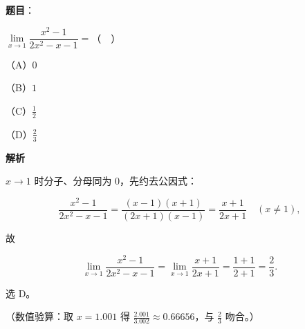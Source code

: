 \begin{answer}

\textbf{题目}：

$\lim\limits_{x\to1}\dfrac{x^2-1}{2x^2-x-1}=$（　）

（A）$0$

（B）$1$

（C）$\frac12$

（D）$\frac23$

\textbf{解析}

$x\to1$ 时分子、分母同为 $0$，先约去公因式：

\nopagebreak[4]
\[\frac{x^{2}-1}{2x^{2}-x-1}=\frac{(x-1)(x+1)}{(2x+1)(x-1)}=\frac{x+1}{2x+1}\quad(x\ne1),\]

故

\nopagebreak[4]
\[\lim_{x\to1}\frac{x^{2}-1}{2x^{2}-x-1}=\lim_{x\to1}\frac{x+1}{2x+1}=\frac{1+1}{2+1}=\frac23 .\]

选 D。

（数值验算：取 $x=1.001$ 得 $\frac{2.001}{3.002}\approx0.66656$，与 $\frac23$ 吻合。）


\end{answer}
